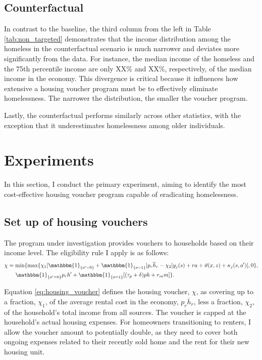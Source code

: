 \documentclass[parskip=full]{article}
\newcommand{\indicator}[1]{\mathbbm{1}_{\left\{ {#1} \right\} }}
\begin{document}
\subsection{Counterfactual}

In contrast to the baseline, the third column from the left in Table \ref{tab:non_targeted} demonstrates that the income distribution among the homeless in the counterfactual scenario is much narrower and deviates more significantly from the data. For instance, the median income of the homeless and the 75th percentile income are only XX\% and XX\%, respectively, of the median income in the economy. This divergence is critical because it influences how extensive a housing voucher program must be to effectively eliminate homelessness. The narrower the distribution, the smaller the voucher program. 

Lastly, the counterfactual performs similarly across other statistics, with the exception that it underestimates homelessness among older individuals.

\section{Experiments}\label{sec:experiments}

In this section, I conduct the primary experiment, aiming to identify the most cost-effective housing voucher program capable of eradicating homelessness. 

\subsection{Set up of housing vouchers}

The program under investigation provides vouchers to households based on their income level. The eligibility rule I apply is as follows:
\begin{align}\label{eq:housing_voucher}
& \chi = \mbox{min}\{\mbox{max}\{\chi_{1} [\indicator{o'=0}+\indicator{o=1}] p_{r} \overline{h}_{r}-\chi_{2} [y_{j}(s)+ra+\vartheta(x,z)+ \kappa_{j}(s,o')],0\},\notag \\ & \qquad \indicator{o'=0} p_{r} h'+\indicator{o=1} [(\tau_{p}+\delta) p h +r_{m} m]\}.
\end{align}

\noindent Equation \eqref{eq:housing_voucher} defines the housing voucher, $\chi$, as covering up to a fraction, $\chi_{1}$, of the average rental cost in the economy, $p_{r}\overline{h}_{r}$, less a fraction, $\chi_{2}$, of the household’s total income from all sources. The voucher is capped at the household's actual housing expenses. For homeowners transitioning to renters, I allow the voucher amount to potentially double, as they need to cover both ongoing expenses related to their recently sold home and the rent for their new housing unit. 
\end{document}
